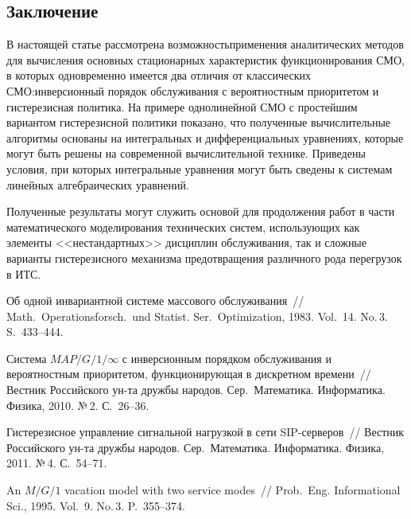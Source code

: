 \begin{multicols}{2}
\section{Заключение}


В настоящей статье рассмотрена возможность\linebreak применения
аналитических методов для вы\-чис\-ле\-ния основных стационарных
характеристик функ\-ци\-о\-ни\-ро\-ва\-ния СМО, в которых
одновременно имеется два отличия от
классических СМО:\linebreak инверсионный порядок обслуживания с
вероятностным приоритетом и гистерезисная политика.
На примере однолинейной СМО с простейшим вариантом
гистерезисной политики показано, что полученные
вычислительные алгоритмы основаны на интегральных
и дифференциальных уравнениях, которые могут быть решены
на современной вы\-чис\-ли\-тель\-ной технике.
Приведены условия, при которых интегральные уравнения
могут быть сведены к системам линейных алгебраических
уравнений.

Полученные результаты могут служить основой для
продолжения работ в части математического моделирования
технических систем, ис\-поль\-зу\-ющих как элементы
<<нестандартных>> дисциплин обслуживания, так и сложные
варианты гистерезисного механизма предотвращения
различного рода перегрузок в ИТС.


{\small\frenchspacing
{%
\begin{thebibliography}{99}

 Об одной инвариантной системе массового
обслуживания~// Math.\ Operationsforsch.\ und Statist. Ser.\
Optimization, 1983. Vol.~14. No.\,3. S.~433--444.

 Система $MAP/G/1/\infty$ с
инверсионным порядком обслуживания и вероятностным приоритетом,
функционирующая в дискретном времени~// Вестник Российского
ун-та дружбы народов. Сер.\ Математика. Информатика. Физика,
2010. №\,2. С.~26--36.

 Гистерезисное
управление сигнальной нагрузкой в сети SIP-сер\-ве\-ров~// Вестник
Российского ун-та дружбы народов. Сер.\ Математика.
Информатика. Физика, 2011. №\,4. С.~54--71.

An $M/G/1$ vacation model with two service modes~//
Prob.\ Eng. Informational Sci., 1995. Vol.~9. No.\,3. P.~355--374.


\end{thebibliography}}}
\end{multicols}
